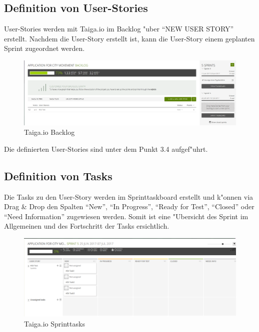 \documentclass[a4paper, 11pt]{scrreprt}
\begin{document}
\subsection{Definition von User-Stories}

User-Stories werden mit Taiga.io im Backlog "uber "`NEW USER STORY"' erstellt. Nachdem die User-Story erstellt ist, kann die User-Story einem geplanten Sprint zugeordnet werden.

\begin{figure} [H]
\begin{center}

\includegraphics[width=16cm]{backlog.png}
\caption{Taiga.io Backlog}

\end{center}
\end{figure}

Die definierten User-Stories sind unter dem Punkt 3.4 aufgef"uhrt.


\subsection{Definition von Tasks}

Die Tasks zu den User-Story werden im Sprinttaskboard erstellt und k"onnen via Drag \& Drop den Spalten "`New"', "`In Progress"', "`Ready for Test"', "`Closed"' oder "`Need Information"' zugewiesen werden. Somit ist eine "Ubersicht des Sprint im Allgemeinen und des Fortschritt der Tasks ersichtlich.

\begin{figure} [H]
\begin{center}

\includegraphics[width=16cm]{sprint_tasks.png}
\caption{Taiga.io Sprinttasks}

\end{center}
\end{figure}
\end{document}
